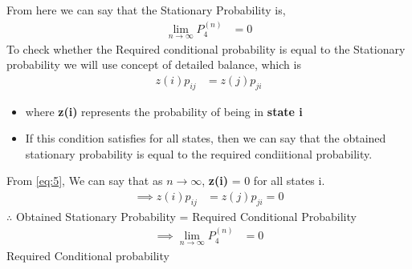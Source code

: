 \documentclass[journal,12pt,onecolumn]{IEEEtran}
\begin{document}
From here we can say that the Stationary Probability is,
\begin{align}
    \lim_{n \to \infty} P_{4}^{(n)} &= 0
\end{align}
To check whether the Required conditional probability is equal to the Stationary probability we will use concept of detailed balance, which is 
\begin{align}
z(i)p_{ij} &= z(j)p_{ji}
\end{align}
\begin{itemize}
\item where \textbf{z(i)} represents the probability of being in \textbf{state i}
\item If this condition satisfies for all states, then we can say that the obtained stationary probability is equal to the required condiitional probability.
\end{itemize}
From \eqref{eq:5}, We can say that as $n \to \infty$, \textbf{z(i)} = 0 for all states i.
\begin{align}
\implies z(i)p_{ij} &= z(j)p_{ji} = 0
\end{align}
\centering
$\therefore$ Obtained Stationary Probability = Required Conditional Probability\\
\begin{align}
 \implies   \lim_{n \to \infty} P_{4}^{(n)} &= 0
\end{align} 
\centering
Required Conditional probability
\end{document}
